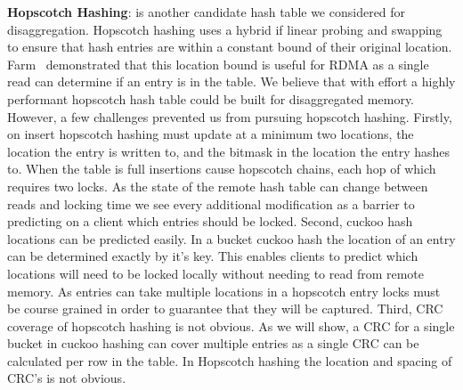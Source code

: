 
\textbf{Hopscotch Hashing}:
is another candidate hash table
we considered for disaggregation. Hopscotch hashing uses a
hybrid if linear probing and swapping to ensure that hash
entries are within a constant bound of their original
location. Farm~\cite{farm} demonstrated that this location
bound is useful for RDMA as a single read can determine if
an entry is in the table. We believe that with effort a
highly performant hopscotch hash table could be built for
disaggregated memory. However, a few challenges prevented us
from pursuing hopscotch hashing. 
Firstly, on insert hopscotch hashing must update at a
minimum two locations, the location the entry is written to,
and the bitmask in the location the entry hashes to. When
the table is full insertions cause hopscotch chains, each
hop of which requires two locks. As the state of the remote
hash table can change between reads and locking time we see
every additional modification as a barrier to predicting on
a client which entries should be locked.
Second, cuckoo hash locations can be predicted easily. In a
bucket cuckoo hash the location of an entry can be
determined exactly by it's key. This enables clients to
predict which locations will need to be locked locally
without needing to read from remote memory. As entries can
take multiple locations in a hopscotch entry locks must be
course grained in order to guarantee that they will be
captured.
Third, CRC coverage of hopscotch hashing is not obvious. As
we will show, a CRC for a single bucket in cuckoo hashing
can cover multiple entries as a single CRC can be calculated
per row in the table. In Hopscotch hashing the location and
spacing of CRC's is not obvious.


